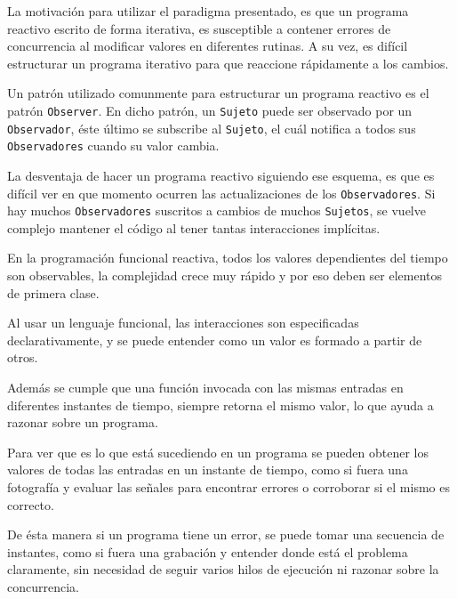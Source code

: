 
  La motivación para utilizar el paradigma presentado, es que un programa reactivo escrito de
forma iterativa, es susceptible a contener errores de concurrencia al modificar valores en diferentes
rutinas. A su vez, es difícil estructurar un programa iterativo para que reaccione rápidamente a
los cambios.

  Un patrón utilizado comunmente para estructurar un programa reactivo es el patrón \texttt{Observer}.
En dicho patrón, un \texttt{Sujeto} puede ser observado por un \texttt{Observador}, éste último se
subscribe al \texttt{Sujeto}, el cuál notifica a todos sus \texttt{Observadores} cuando su valor cambia.
  
  La desventaja de hacer un programa reactivo siguiendo ese esquema, es que es difícil ver en que
momento ocurren las actualizaciones de los \texttt{Observadores}.
  Si hay muchos \texttt{Observadores} suscritos a cambios de muchos \texttt{Sujetos},
se vuelve complejo mantener el código al tener tantas interacciones implícitas.
  
  En la programación funcional reactiva, todos los valores dependientes del tiempo son observables,
la complejidad crece muy rápido y por eso deben ser elementos de primera clase.

  Al usar un lenguaje funcional, las interacciones son especificadas declarativamente, y se puede
entender como un valor es formado a partir de otros.

  Además se cumple que una función invocada con las mismas entradas en diferentes
instantes de tiempo, siempre retorna el mismo valor, lo que ayuda a razonar sobre un programa.

  Para ver que es lo que está sucediendo en un programa se pueden obtener los valores de
  todas las entradas en un instante de tiempo, como si fuera una fotografía 
  y evaluar las señales para encontrar errores o corroborar si el mismo es correcto.

  De ésta manera si un programa tiene un error, se puede tomar una secuencia de instantes,
como si fuera una grabación y entender donde está el problema claramente,
sin necesidad de seguir varios hilos de ejecución ni razonar sobre la concurrencia.
